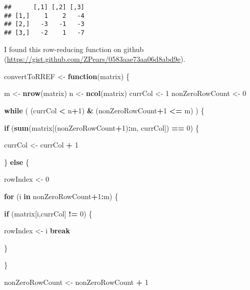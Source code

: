 \documentclass[]{article}
\newenvironment{Shaded}{\begin{snugshade}}{\end{snugshade}}
\newcommand{\KeywordTok}[1]{\textcolor[rgb]{0.13,0.29,0.53}{\textbf{#1}}}
\newcommand{\DecValTok}[1]{\textcolor[rgb]{0.00,0.00,0.81}{#1}}
\newcommand{\StringTok}[1]{\textcolor[rgb]{0.31,0.60,0.02}{#1}}
\newcommand{\ControlFlowTok}[1]{\textcolor[rgb]{0.13,0.29,0.53}{\textbf{#1}}}
\newcommand{\OperatorTok}[1]{\textcolor[rgb]{0.81,0.36,0.00}{\textbf{#1}}}
\newcommand{\NormalTok}[1]{#1}
\begin{document}
\begin{verbatim}
##      [,1] [,2] [,3]
## [1,]    1    2   -4
## [2,]   -3   -1   -3
## [3,]   -2    1   -7
\end{verbatim}

I found this row-reducing function on github
(\url{https://gist.github.com/ZPears/0583aae73aa06d8abd9e}).

\begin{Shaded}
\begin{Highlighting}[]
\NormalTok{convertToRREF <-}\StringTok{ }\ControlFlowTok{function}\NormalTok{(matrix) \{}

\NormalTok{  m <-}\StringTok{ }\KeywordTok{nrow}\NormalTok{(matrix)}
\NormalTok{  n <-}\StringTok{ }\KeywordTok{ncol}\NormalTok{(matrix)}
\NormalTok{  currCol <-}\StringTok{ }\DecValTok{1}
\NormalTok{  nonZeroRowCount <-}\StringTok{ }\DecValTok{0}
  
  \ControlFlowTok{while}\NormalTok{ ( (currCol }\OperatorTok{<}\StringTok{ }\NormalTok{n}\OperatorTok{+}\DecValTok{1}\NormalTok{) }\OperatorTok{&}\StringTok{ }\NormalTok{(nonZeroRowCount}\OperatorTok{+}\DecValTok{1} \OperatorTok{<=}\StringTok{ }\NormalTok{m) )  \{}

    \ControlFlowTok{if}\NormalTok{ (}\KeywordTok{sum}\NormalTok{(matrix[(nonZeroRowCount}\OperatorTok{+}\DecValTok{1}\NormalTok{)}\OperatorTok{:}\NormalTok{m, currCol]) }\OperatorTok{==}\StringTok{ }\DecValTok{0}\NormalTok{) \{}
      
\NormalTok{      currCol <-}\StringTok{ }\NormalTok{currCol }\OperatorTok{+}\StringTok{ }\DecValTok{1}

\NormalTok{    \} }\ControlFlowTok{else}\NormalTok{ \{}
      
\NormalTok{      rowIndex <-}\StringTok{ }\DecValTok{0}
    
      \ControlFlowTok{for}\NormalTok{ (i }\ControlFlowTok{in}\NormalTok{ nonZeroRowCount}\OperatorTok{+}\DecValTok{1}\OperatorTok{:}\NormalTok{m) \{}
        
        \ControlFlowTok{if}\NormalTok{ (matrix[i,currCol] }\OperatorTok{!=}\StringTok{ }\DecValTok{0}\NormalTok{) \{}
          
\NormalTok{          rowIndex <-}\StringTok{ }\NormalTok{i}
          \ControlFlowTok{break}
          
\NormalTok{        \}}
        
\NormalTok{      \}}
      
\NormalTok{      nonZeroRowCount <-}\StringTok{ }\NormalTok{nonZeroRowCount }\OperatorTok{+}\StringTok{ }\DecValTok{1}
      

\end{Highlighting}
\end{Shaded}
\end{document}
